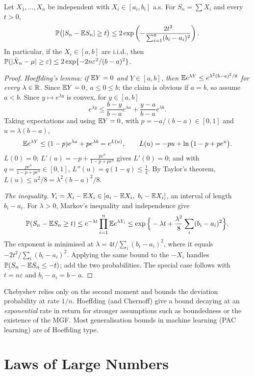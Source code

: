 \documentclass[main.tex]{subfiles}
\begin{document}
\begin{theorem}\label{thm:hoeffding}
Let $X_1,\dots,X_n$ be independent with $X_i\in[a_i,b_i]$ a.s. For $S_n=\sum X_i$ and every $t>0$,
\[
\P\big(|S_n-\E S_n|\ge t\big)\le 2\exp\left(-\frac{2t^2}{\sum_{i=1}^n(b_i-a_i)^2}\right).
\]
In particular, if the $X_i\in[a,b]$ are i.i.d., then $\P(|\bar X_n-\mu|\ge\varepsilon)\le 2\exp\{-2n\varepsilon^2/(b-a)^2\}$.
\end{theorem}
\begin{proof}
\emph{Hoeffding's lemma: if $\E Y=0$ and $Y\in[a,b]$, then $\E e^{\lambda Y}\le e^{\lambda^2(b-a)^2/8}$ for every $\lambda\in\R$.} Since $\E Y=0$, $a\le0\le b$; the claim is obvious if $a=b$, so assume $a<b$. Since $y\mapsto e^{\lambda y}$ is convex, for $y\in[a,b]$
\[
e^{\lambda y}\le\frac{b-y}{b-a}e^{\lambda a}+\frac{y-a}{b-a}e^{\lambda b}.
\]
Taking expectations and using $\E Y=0$, with $p=-a/(b-a)\in[0,1]$ and $u=\lambda(b-a)$,
\[
\E e^{\lambda Y}\le(1-p)e^{\lambda a}+pe^{\lambda b}=e^{L(u)},\qquad L(u)=-pu+\ln\big(1-p+pe^{u}\big).
\]
$L(0)=0$; $L'(u)=-p+\frac{pe^u}{1-p+pe^u}$ gives $L'(0)=0$; and with $q=\frac{pe^u}{1-p+pe^u}\in[0,1]$, $L''(u)=q(1-q)\le\frac14$. By Taylor's theorem, $L(u)\le u^2/8=\lambda^2(b-a)^2/8$.

\emph{The inequality.} $Y_i=X_i-\E X_i\in[a_i-\E X_i,\ b_i-\E X_i]$, an interval of length $b_i-a_i$. For $\lambda>0$, Markov's inequality and independence give
\[
\P(S_n-\E S_n\ge t)\le e^{-\lambda t}\prod_{i=1}^n\E e^{\lambda Y_i}\le\exp\Big\{-\lambda t+\frac{\lambda^2}{8}\sum_i(b_i-a_i)^2\Big\}.
\]
The exponent is minimised at $\lambda=4t/\sum_i(b_i-a_i)^2$, where it equals $-2t^2/\sum_i(b_i-a_i)^2$. Applying the same bound to the $-X_i$ handles $\P(S_n-\E S_n\le-t)$; add the two probabilities. The special case follows with $t=n\varepsilon$ and $b_i-a_i=b-a$.
\end{proof}

\begin{remark}
Chebyshev relies only on the second moment and bounds the deviation probability at rate $1/n$. Hoeffding (and Chernoff) give a bound decaying at an \emph{exponential} rate in return for stronger assumptions such as boundedness or the existence of the MGF. Most generalisation bounds in machine learning (PAC learning) are of Hoeffding type.
\end{remark}

\section{Laws of Large Numbers}
\end{document}
